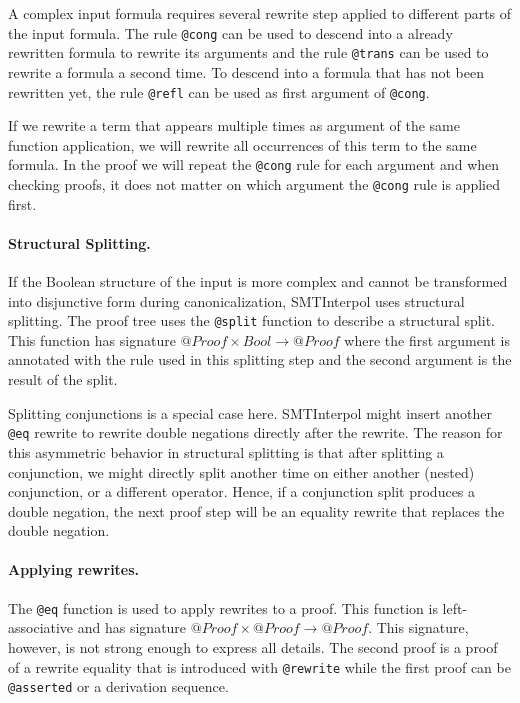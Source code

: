 \documentclass[a4paper]{article}
\newcommand\si{SMTInterpol\xspace}
\begin{document}
A complex input formula requires several rewrite step applied to
different parts of the input formula.  The rule \verb+@cong+ can be
used to descend into a already rewritten formula to rewrite its
arguments and the rule \verb+@trans+ can be used to rewrite a formula
a second time.  To descend into a formula that has not been rewritten
yet, the rule \verb+@refl+ can be used as first argument of
\verb+@cong+.

If we rewrite a term that appears multiple times as argument of the
same function application, we will rewrite all occurrences of this
term to the same formula.  In the proof we will repeat the
\verb+@cong+ rule for each argument and when checking proofs, it does
not matter on which argument the \verb+@cong+ rule is applied first.

\paragraph{Structural Splitting.}  If the Boolean structure of the input is
more complex and cannot be transformed into disjunctive form during
canonicalization, \si uses structural splitting.  The proof tree uses the
\verb+@split+ function to describe a structural split.  This function has
signature $@Proof\times Bool\rightarrow @Proof$ where the first argument is
annotated with the rule used in this splitting step and the second argument is
the result of the split.

Splitting conjunctions is a special case here.  \si might insert another
\verb+@eq+ rewrite to rewrite double negations directly after the rewrite.
The reason for this asymmetric behavior in structural splitting is that after
splitting a conjunction, we might directly split another time on either
another (nested) conjunction, or a different operator.  Hence, if a
conjunction split produces a double negation, the next proof step will be an
equality rewrite that replaces the double negation.

\paragraph{Applying rewrites.}  The \verb+@eq+ function is used to apply
rewrites to a proof.  This function is left-associative and has signature
$@Proof\times@Proof\rightarrow @Proof$.  This signature, however, is not
strong enough to express all details.  The second proof is a proof of a
rewrite equality that is introduced with \verb+@rewrite+
while the first proof can be \verb+@asserted+ or a derivation sequence.
\end{document}

